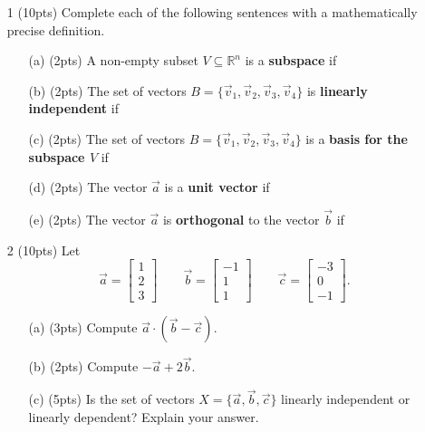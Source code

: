 \documentclass{article}
\newcommand{\R}{\mathbb{R}}
\newcommand{\mat}[1]{\begin{bmatrix}#1\end{bmatrix}}
\begin{document}
\begin{enumerate}
	\item[1 (10pts)] Complete each of the following sentences with a mathematically precise definition.
	\begin{enumerate}
		\item[(a) (2pts)] A non-empty subset $V\subseteq \R^n$ is a {\bf subspace} if
		\vspace{1.5in}
		\item[(b) (2pts)] The set of vectors $B=\{\vec v_1,\vec v_2,\vec v_3,\vec v_4\}$ is {\bf linearly independent} if
		\vspace{1.5in}
		\item[(c) (2pts)] The set of vectors $B=\{\vec v_1,\vec v_2,\vec v_3,\vec v_4\}$ is a {\bf basis for the subspace $V$} if
		\vspace{1.5in}
		\item[(d) (2pts)] The vector $\vec a$ is a {\bf unit vector} if
		\vspace{1.5in}
		\item[(e) (2pts)] The vector $\vec a$ is {\bf orthogonal} to the vector $\vec b$ if
		\vspace{1in}
		
	
		\vspace{5in}
	\end{enumerate}
	\clearpage

	\item[2 (10pts)] Let
		\[
			\vec a = \mat{1\\2\\3}\qquad \vec b=\mat{-1\\1\\1}\qquad \vec c=\mat{-3\\0\\-1}.
		\]
	\begin{enumerate}
		\item[(a) (3pts)] Compute $\vec a\cdot(\vec b-\vec c)$.
		\vspace{1.5in}
		\item[(b) (2pts)] Compute $-\vec a+2\vec b$.
		\vspace{1.5in}
		\item[(c) (5pts)] Is the set of vectors $X=\{\vec a,\vec b,\vec c\}$ linearly independent or linearly dependent?  Explain your
		answer.
		\vspace{1in}
		

\end{enumerate}
\end{enumerate}
\end{document}
